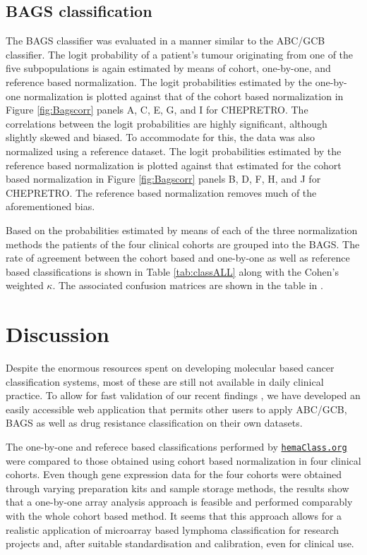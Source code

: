 \documentclass[10pt,letterpaper]{article}
\newcommand{\hemaClass}{\href{http://hemaClass.org}{\texttt{hemaClass.org}}}
\begin{document}
\subsection*{BAGS classification}
The BAGS classifier was evaluated in a manner similar to the ABC/GCB classifier.
The logit probability of a patient's tumour originating from one of the five subpopulations is again estimated by means of cohort, one-by-one, and reference based normalization.
The logit probabilities estimated by the one-by-one normalization is plotted against that of the cohort based normalization in Figure \ref{fig:Bagscorr} panels A, C, E, G, and I for CHEPRETRO.
The correlations between the logit probabilities are highly significant, although slightly skewed and biased.
To accommodate for this, the data was also normalized using a reference dataset.
The logit probabilities estimated by the reference based normalization is plotted against that estimated for the cohort based normalization in Figure \ref{fig:Bagscorr} panels B, D, F, H, and J for CHEPRETRO.
The reference based normalization removes much of the aforementioned bias.

Based on the probabilities estimated by means of each of the three normalization methods the patients of the four clinical cohorts are grouped into the BAGS.
The rate of agreement between the cohort based and one-by-one as well as reference based classifications is shown in Table \ref{tab:classALL} along with the Cohen's weighted $\kappa$.
The associated confusion matrices are shown in the table in .




\section*{Discussion}
Despite the enormous resources spent on developing molecular based cancer classification systems,
most of these are still not available in daily clinical practice.
To allow for fast validation of our recent findings \cite{DybkaerBoegsted2015, Falgreen2015}, we have developed an easily accessible web application that permits other users to apply ABC/GCB, BAGS as well as drug resistance classification on their own datasets.

The one-by-one and referece based classifications performed by \hemaClass{} were compared to those obtained using cohort based normalization in four clinical cohorts.
Even though gene expression data for the four cohorts were obtained through varying preparation kits and sample storage methods, the results show that a one-by-one array analysis approach is feasible and performed comparably with the whole cohort based method.
It seems that this approach allows for a realistic application of microarray based lymphoma classification for research projects and, after suitable standardisation and calibration, even for clinical use.
\end{document}
